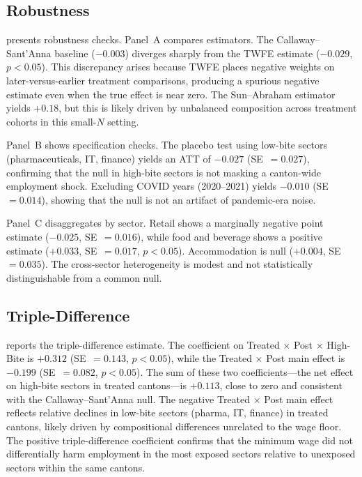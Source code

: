 \documentclass[12pt]{article}
\begin{document}
\subsection{Robustness}

 presents robustness checks. Panel~A compares estimators. The Callaway--Sant'Anna baseline ($-0.003$) diverges sharply from the TWFE estimate ($-0.029$, $p < 0.05$). This discrepancy arises because TWFE places negative weights on later-versus-earlier treatment comparisons, producing a spurious negative estimate even when the true effect is near zero. The Sun--Abraham estimator yields $+0.18$, but this is likely driven by unbalanced composition across treatment cohorts in this small-$N$ setting.

Panel~B shows specification checks. The placebo test using low-bite sectors (pharmaceuticals, IT, finance) yields an ATT of $-0.027$ (SE~$= 0.027$), confirming that the null in high-bite sectors is not masking a canton-wide employment shock. Excluding COVID years (2020--2021) yields $-0.010$ (SE~$= 0.014$), showing that the null is not an artifact of pandemic-era noise.

Panel~C disaggregates by sector. Retail shows a marginally negative point estimate ($-0.025$, SE~$= 0.016$), while food and beverage shows a positive estimate ($+0.033$, SE~$= 0.017$, $p < 0.05$). Accommodation is null ($+0.004$, SE~$= 0.035$). The cross-sector heterogeneity is modest and not statistically distinguishable from a common null.



\subsection{Triple-Difference}

 reports the triple-difference estimate. The coefficient on Treated $\times$ Post $\times$ High-Bite is $+0.312$ (SE~$= 0.143$, $p < 0.05$), while the Treated $\times$ Post main effect is $-0.199$ (SE~$= 0.082$, $p < 0.05$). The sum of these two coefficients---the net effect on high-bite sectors in treated cantons---is $+0.113$, close to zero and consistent with the Callaway--Sant'Anna null. The negative Treated $\times$ Post main effect reflects relative declines in low-bite sectors (pharma, IT, finance) in treated cantons, likely driven by compositional differences unrelated to the wage floor. The positive triple-difference coefficient confirms that the minimum wage did not differentially harm employment in the most exposed sectors relative to unexposed sectors within the same cantons.
\end{document}
